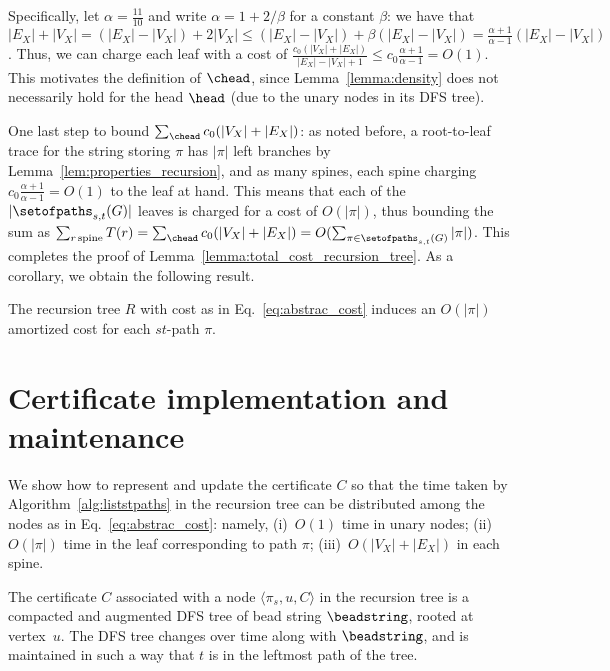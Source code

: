Specifically, let $\alpha = \frac{11}{10}$ and write $\alpha = 1 +
2/\beta$ for a constant $\beta$: we have that $|E_X| + |V_X| = (|E_X|
- |V_X|) + 2 |V_X| \leq (|E_X| - |V_X|) + \beta (|E_X| - |V_X|) =
\frac{\alpha+1}{\alpha-1} (|E_X| - |V_X|)$. Thus, we can charge each
leaf with a cost of $\frac{c_0 (|V_X| + |E_X|)}{|E_X| - |V_X| + 1}
\leq c_0 \frac{\alpha+1}{\alpha-1} = O(1)$. This motivates the
definition of $\chead$, since Lemma~\ref{lemma:density} does not
necessarily hold for the head $\head$ (due to the unary nodes in its
DFS tree).

One last step to bound $\sum_{\chead} c_0 (|V_X| + |E_X|)$: as noted
before, a root-to-leaf trace for the string storing $\pi$ has $|\pi|$
left branches by Lemma~\ref{lem:properties_recursion}, and as many
spines, each spine charging $c_0 \frac{\alpha+1}{\alpha-1} = O(1)$ to
the leaf at hand. This means that each of the $|\setofpaths_{s,t}(G)|$
leaves is charged for a cost of $O(|\pi|)$, thus bounding the sum as
$\sum_{r\,\mathrm{spine}} T(r) = \sum_{\chead} c_0 (|V_X| + |E_X|) =
O(\sum_{\pi \in \setofpaths_{s,t}(G)}{|\pi|})$. This completes the
proof of Lemma~\ref{lemma:total_cost_recursion_tree}. As a corollary,
we obtain the following result.

\begin{lemma}
  \label{lemma:amortized_cost_per_path}
  The recursion tree $R$ with cost as in Eq.~\eqref{eq:abstrac_cost}
  induces an $O(|\pi|)$ amortized cost for each $st$-path $\pi$.
\end{lemma}


\section{Certificate implementation and maintenance}
\label{sec:certificate}

We show how to represent and update the certificate $C$ so that the
time taken by Algorithm~\ref{alg:liststpaths} in the recursion tree
can be distributed among the nodes as in Eq.~\eqref{eq:abstrac_cost}:
namely, (i)~$O(1)$ time in unary nodes; (ii)~$O(|\pi|)$ time in the
leaf corresponding to path $\pi$; (iii)~$O(|V_X| + |E_X|)$ in each
spine.

The certificate $C$ associated with a node $\langle \pi_s, u, C
\rangle$ in the recursion tree is a compacted and augmented DFS tree
of bead string $\beadstring$, rooted at vertex~$u$. The DFS tree
changes over time along with $\beadstring$, and is
maintained in such a way that $t$ is in the leftmost path of the tree.

